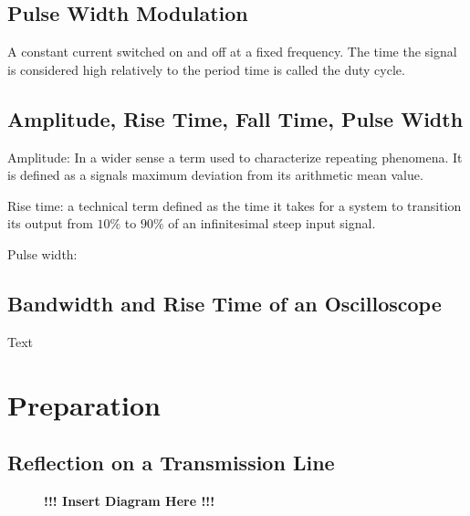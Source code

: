     \subsection*{Pulse Width Modulation}
    A constant current switched on and off at a fixed frequency. The time the signal is considered high relatively to the
    period time is called the duty cycle.
    \subsection*{Amplitude, Rise Time, Fall Time, Pulse Width}
    Amplitude: In a wider sense a term used to characterize repeating phenomena. It is defined as a signals maximum deviation
    from its arithmetic mean value.\par
    Rise time: a technical term defined as the time it takes for a system to transition its output from \( 10\% \) to \( 90\% \)
    of an infinitesimal steep input signal.\par
    Pulse width: 
    \subsection*{Bandwidth and Rise Time of an Oscilloscope}
    Text
\section{Preparation}
%
    \subsection*{Reflection on a Transmission Line}
    \begin{figure}[h]
        \centering
        \begin{framed}
            \textbf{!!! Insert Diagram Here !!!}
        \end{framed}
    \end{figure}
